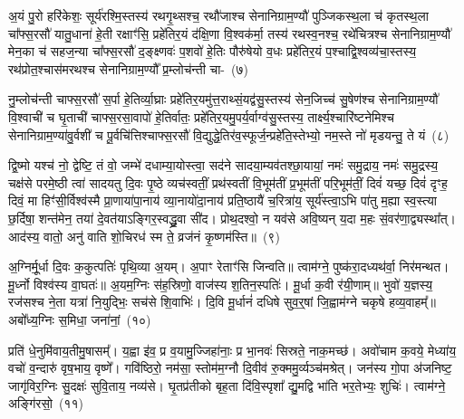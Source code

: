 {\anuvakamend[{प्र॒तीची॒ दिङ्म॒रुत॑स्ते दे॒वा अधि॑पतयश्चत्वारि॒ꣳ॒शच्च॑}]}

अ॒यं पु॒रो हरि॑केशः॒ सूर्य॑रश्मि॒स्तस्य॑ रथगृ॒थ्सश्च॒ रथौ॑जाश्च सेनानिग्राम॒ण्यौ॑ पुञ्जिकस्थ॒ला च॑ कृतस्थ॒ला चा᳚फ्स॒रसौ॑ यातु॒धाना॑ हे॒ती रक्षाꣳ॑सि॒ प्रहे॑तिर॒यं द॑क्षि॒णा वि॒श्वक॑र्मा॒ तस्य॑ रथस्व॒नश्च॒ रथे॑चित्रश्च सेनानिग्राम॒ण्यौ॑ मेन॒का च॑ सहज॒न्या चा᳚फ्स॒रसौ॑ द॒ङ्क्ष्णवः॑ प॒शवो॑ हे॒तिः पौरु॑षेयो व॒धः प्रहे॑तिर॒यं प॒श्चाद्वि॒श्वव्य॑चा॒स्तस्य॒ रथ॑प्रोत॒श्चास॑मरथश्च सेनानिग्राम॒ण्यौ᳚ प्र॒म्लोच॑न्ती चा-~(७)\ip

नु॒म्लोच॑न्ती चाफ्स॒रसौ॑ स॒र्पा हे॒तिर्व्या॒घ्राः प्रहे॑तिर॒यमु॑त्त॒राथ्\-सं॒यद्व॑सु॒स्तस्य॑ सेन॒जिच्च॑ सु॒षेण॑श्च सेनानिग्राम॒ण्यौ॑ वि॒श्वाची॑ च घृ॒ताची॑ चाफ्स॒रसा॒वापो॑ हे॒तिर्वातः॒ प्रहे॑ति\-र॒यमु॒पर्य॒र्वाग्व॑सु॒स्तस्य॒ तार्क्ष्य॒श्चारि॑ष्टनेमिश्च सेनानिग्राम॒ण्या॑\-वु॒र्वशी॑ च पू॒र्वचि॑त्तिश्चाफ्स॒रसौ॑ वि॒द्युद्धे॒तिर॑व॒स्फूर्ज॒न्प्रहे॑ति॒स्तेभ्यो॒ नम॒स्ते नो॑ मृडयन्तु॒ ते यं~(८)\ip

द्वि॒ष्मो यश्च॑ नो॒ द्वेष्टि॒ तं वो॒ जम्भे॑ दधाम्या॒योस्त्वा॒ सद॑ने सादया॒म्यव॑तश्छा॒यायां॒ नमः॑ समु॒द्राय॒ नमः॑ समु॒द्रस्य॒ चक्ष॑से परमे॒ष्ठी त्वा॑ सादयतु दि॒वः पृ॒ष्ठे व्यच॑स्वतीं॒ प्रथ॑स्वतीं वि॒भूम॑तीं प्र॒भूम॑तीं परि॒भूम॑तीं॒ दिवं॑ यच्छ॒ दिवं॑ दृꣳह॒ दिवं॒ मा हिꣳ॑सी॒र्विश्व॑स्मै प्रा॒णाया॑पा॒नाय॑ व्या॒नायो॑दा॒नाय॑ प्रति॒ष्ठायै॑ च॒रित्रा॑य॒ सूर्य॑स्त्वा॒ऽभि पा॑तु म॒ह्या स्व॒स्त्या छ॒र्दिषा॒ शन्त॑मेन॒ तया॑ दे॒वत॑या\-ऽ\-ङ्गिर॒स्वद्ध्रु॒वा सी॑द। प्रोथ॒दश्वो॒ न यव॑से अवि॒ष्यन् य॒दा म॒हः सं॒वर॑णा॒द्व्यस्था᳚त्। आद॑स्य॒ वातो॒ अनु॑ वाति शो॒चिरध॑ स्म ते॒ व्रज॑नं कृ॒ष्णम॑स्ति॥~(९)\ip

{\anuvakamend[{प्र॒म्लोच॑न्ती च॒ यꣴ स्व॒स्त्याष्टाविꣳ॑शतिश्च}]}

अ॒ग्निर्मू॒र्धा दि॒वः क॒कुत्पतिः॑ पृथि॒व्या अ॒यम्। अ॒पाꣳ रेताꣳ॑सि जिन्वति॥ त्वाम॑ग्ने॒ पुष्क॑रा॒दध्यथ॑र्वा॒ निर॑मन्थत। मू॒र्ध्नो विश्व॑स्य वा॒घतः॑॥ अ॒यम॒ग्निः स॑ह॒स्रिणो॒ वाज॑स्य श॒तिन॒स्पतिः॑। मू॒र्धा क॒वी र॑यी॒णाम्॥ भुवो॑ य॒ज्ञस्य॒ रज॑सश्च ने॒ता यत्रा॑ नि॒युद्भिः॒ सच॑से शि॒वाभिः॑। दि॒वि मू॒र्धानं॑ दधिषे सुव॒र्॒\mbox{}षां जि॒ह्वाम॑ग्ने चकृषे हव्य॒वाहम्᳚॥ अबो᳚ध्य॒ग्निः स॒मिधा॒ जना॑नां॒~(१०)\ip

प्रति॑ धे॒नुमि॑वाय॒तीमु॒षासम्᳚। य॒ह्वा इ॑व॒ प्र व॒यामु॒ज्जिहा॑नाः॒ प्र भा॒नवः॑ सिस्रते॒ नाक॒मच्छ॑। अवो॑चाम क॒वये॒ मेध्या॑य॒ वचो॑ व॒न्दारु॑ वृष॒भाय॒ वृष्णे᳚। गवि॑ष्ठिरो॒ नम॑सा॒ स्तोम॑म॒ग्नौ दि॒वीव॑ रु॒क्ममु॒र्व्यञ्च॑मश्रेत्। जन॑स्य गो॒पा अ॑जनिष्ट॒ जागृ॑विर॒ग्निः सु॒दक्षः॑ सुवि॒ताय॒ नव्य॑से। घृ॒तप्र॑तीको बृह॒ता दि॑वि॒स्पृशा᳚ द्यु॒मद्वि भा॑ति भर॒तेभ्यः॒ शुचिः॑। त्वाम॑ग्ने॒ अङ्गि॑रसो॒~(११)\ip

